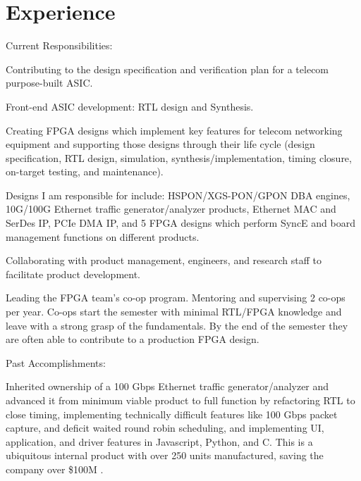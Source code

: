 \documentclass[10pt]{deedy-resume-reversed}
\begin{document}
\begin{minipage}[t]{1.0\textwidth}
\section{Experience}
Current Responsibilities:
\vspace{\topsep} %
\begin{tightemize}
\item Contributing to the design specification and verification plan for a telecom purpose-built ASIC. 
\item Front-end ASIC development: RTL design and Synthesis. 
\item Creating FPGA designs which implement key features for telecom networking equipment and 
supporting those designs through their life cycle (design specification, RTL design, simulation, 
synthesis/implementation, timing closure, on-target testing, and maintenance).
\item Designs I am responsible for include: HSPON/XGS-PON/GPON DBA engines, 
10G/100G Ethernet traffic generator/analyzer products, 
Ethernet MAC and SerDes IP, PCIe DMA IP, and 5 FPGA designs which perform SyncE and board management functions on different products.
\item Collaborating with product management, engineers, and research staff to facilitate product development.
\item Leading the FPGA team's co-op program. Mentoring and supervising 2 co-ops per year. 
Co-ops start the semester with minimal RTL/FPGA knowledge and leave with a strong grasp of 
the fundamentals. By the end of the semester they are often able to contribute to a production FPGA design.
\end{tightemize}
Past Accomplishments:
\begin{tightemize}
\item Inherited ownership of a 100 Gbps Ethernet traffic generator/analyzer and advanced it from minimum viable product to full function by refactoring RTL to close timing, 
implementing technically difficult features like 100 Gbps packet capture, and deficit waited round robin scheduling, and implementing UI, application, 
and driver features in Javascript, Python, and C. This is a ubiquitous internal product with over 250 units manufactured, saving the company over \$100M .

\end{tightemize}
\end{minipage}
\end{document}

